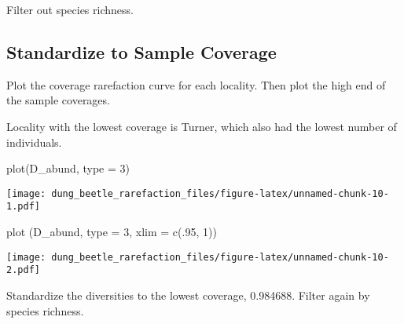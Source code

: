 \documentclass[
]{article}
\newenvironment{Shaded}{\begin{snugshade}}{\end{snugshade}}
\newcommand{\AttributeTok}[1]{\textcolor[rgb]{0.77,0.63,0.00}{#1}}
\newcommand{\CommentTok}[1]{\textcolor[rgb]{0.56,0.35,0.01}{\textit{#1}}}
\newcommand{\DecValTok}[1]{\textcolor[rgb]{0.00,0.00,0.81}{#1}}
\newcommand{\FunctionTok}[1]{\textcolor[rgb]{0.00,0.00,0.00}{#1}}
\newcommand{\NormalTok}[1]{#1}
\newcommand{\OtherTok}[1]{\textcolor[rgb]{0.56,0.35,0.01}{#1}}
\newcommand{\SpecialCharTok}[1]{\textcolor[rgb]{0.00,0.00,0.00}{#1}}
\begin{document}
Filter out species richness.

\begin{Shaded}
\end{Shaded}

\hypertarget{standardize-to-sample-coverage}{%
\subsection{Standardize to Sample
Coverage}\label{standardize-to-sample-coverage}}

Plot the coverage rarefaction curve for each locality. Then plot the
high end of the sample coverages.

Locality with the lowest coverage is Turner, which also had the lowest
number of individuals.

\begin{Shaded}
\begin{Highlighting}[]
\FunctionTok{plot}\NormalTok{(D\_abund, }\AttributeTok{type =} \DecValTok{3}\NormalTok{)}
\end{Highlighting}
\end{Shaded}

\texttt{[image: dung\_beetle\_rarefaction\_files/figure-latex/unnamed-chunk-10-1.pdf]}

\begin{Shaded}
\begin{Highlighting}[]
\FunctionTok{plot}\NormalTok{ (D\_abund, }\AttributeTok{type =} \DecValTok{3}\NormalTok{, }\AttributeTok{xlim =} \FunctionTok{c}\NormalTok{(.}\DecValTok{95}\NormalTok{, }\DecValTok{1}\NormalTok{))}
\end{Highlighting}
\end{Shaded}

\texttt{[image: dung\_beetle\_rarefaction\_files/figure-latex/unnamed-chunk-10-2.pdf]}

Standardize the diversities to the lowest coverage, 0.984688. Filter
again by species richness.
\end{document}
